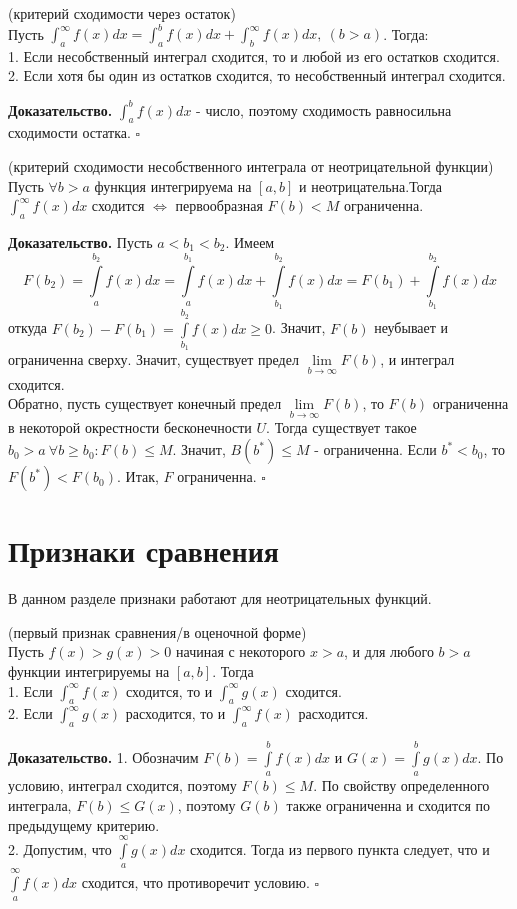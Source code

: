 \begin{theor} (критерий сходимости через остаток)\\ \label{skhod_ost}
Пусть $\int^\infty_af(x)dx=\int^b_af(x)dx+\int^\infty_bf(x)dx,~(b>a)$. 
Тогда:\\
1. Если несобственный интеграл сходится, то и любой из его остатков сходится.\\
2. Если хотя бы один из остатков сходится, то несобственный интеграл сходится.
\end{theor}
\textbf{Доказательство.} $\int^b_af(x)dx$ - число, поэтому сходимость 
равносильна сходимости остатка. $\square$ 

\begin{theor} (критерий сходимости несобственного интеграла от неотрицательной
функции)\\
Пусть $\forall b>a$ функция интегрируема на $[a,b]$ и неотрицательна.Тогда
$\int^\infty_af(x)dx$ сходится $\Leftrightarrow$ первообразная $F(b)<M$ 
ограниченна.
\end{theor}
\textbf{Доказательство.} Пусть $a<b_1<b_2$. Имеем
$$F(b_2)=\int\limits_{a}^{b_2}f(x)dx=\int\limits_{a}^{b_1}f(x)dx+
\int\limits_{b_1}^{b_2}f(x)dx=F(b_1)+\int\limits_{b_1}^{b_2}f(x)dx$$
откуда $F(b_2)-F(b_1)=\int\limits_{b_1}^{b_2}f(x)dx\geqslant 0$. Значит,
$F(b)$ неубывает и ограниченна сверху. Значит, существует предел
$\lim\limits_{b \to \infty}F(b)$, и интеграл сходится.\\
Обратно, пусть существует конечный предел $\lim\limits_{b \to \infty} F(b)$,
то $F(b)$ ограниченна в некоторой окрестности бесконечности $U$.
Тогда существует такое $b_0>a~\forall b\geqslant b_0:F(b)\leqslant M$.
Значит, $B(b^*)\leqslant M$ - ограниченна. Если $b^*<b_0$, то
$F(b^*)<F(b_0)$. Итак, $F$ ограниченна. $\square$

\section{Признаки сравнения}
В данном разделе признаки работают для неотрицательных функций.
\begin{theor} (первый признак сравнения/в оценочной форме)\\
Пусть $f(x)>g(x)>0$ начиная с некоторого $x>a$, и для любого  $b>a$
функции интегрируемы на $[a,b]$. Тогда\\
1. Если  $\int^\infty_a f(x)$ сходится, то и  $\int^\infty_a g(x)$ сходится.\\
2. Если  $\int^\infty_a g(x)$ расходится, то и $\int^\infty_a f(x)$ расходится.
\end{theor}
\textbf{Доказательство.} 1. Обозначим $F(b)=\int\limits_{a}^{b}f(x)dx$ и
$G(x)=\int\limits_{a}^{b}g(x)dx$. По условию, интеграл сходится, поэтому
$F(b)\leqslant M$. По свойству определенного интеграла, $F(b)\leqslant G(x)$,
поэтому $G(b)$ также ограниченна и сходится по предыдущему критерию.\\
2. Допустим, что $\int\limits_{a}^{\infty}g(x)dx$ сходится. Тогда из 
первого пункта следует, что и $\int\limits_{a}^{\infty}f(x)dx$ сходится, 
что противоречит условию. $\square$ 

